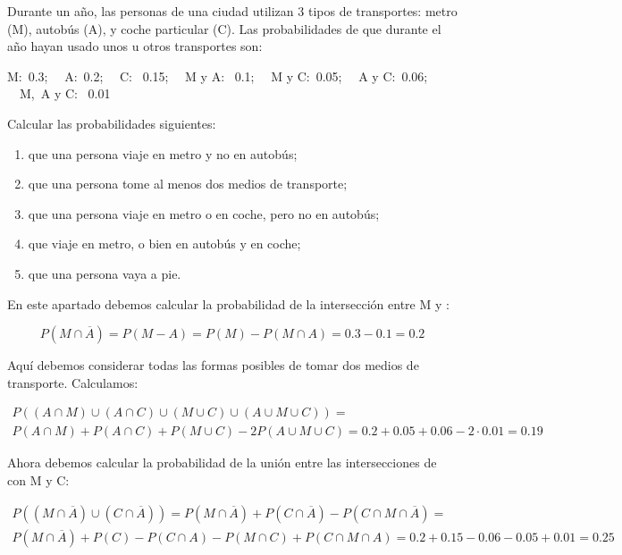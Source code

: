 \problem

Durante un a{\~n}o,  las  personas  de  una  ciudad  utilizan  3  tipos  de
transportes: metro (M),  autob{\'u}s  (A),  y  coche  particular  (C).  Las
probabilidades  de  que  durante  el  a{\~n}o  hayan  usado  unos  u  otros
transportes son:

M:\ 0.3; \ \ A:\ 0.2; \ \ C: \ 0.15; \ \ M y A: \ 0.1; \ \ M y C:\ 0.05; \ \ A y C:\ 0.06; \ \ M,\ A y C: \ 0.01

Calcular las probabilidades siguientes:
\begin{enumerate}
	\item que una persona viaje en metro y no en autob{\'u}s;
	\item que una persona tome al menos dos medios de transporte;
	\item que una persona viaje en metro o en coche, pero no en autob{\'u}s;
	\item que viaje en metro,  o bien en autob{\'u}s y en coche;
	\item que una persona vaya a pie.
\end{enumerate}

\subproblem
En este apartado debemos calcular la probabilidad de la intersección entre M y :

\begin{equation*}
    P(M \cap \overline{A}) = P(M-A) = P(M) - P(M \cap A) = 0.3 - 0.1 = 0.2
\end{equation*}

\subproblem
Aquí debemos considerar todas las formas posibles de tomar dos medios de transporte. Calculamos:

\begin{gather*}
    P((A \cap M) \cup (A \cap C) \cup (M \cup C) \cup (A \cup M \cup C)) =\\ P(A \cap M) + P(A \cap C) + P(M \cup C) - 2P(A \cup M \cup C) = 0.2 + 0.05 + 0.06 - 2 \cdot 0.01 = 0.19
\end{gather*}

\subproblem
Ahora debemos calcular la probabilidad de la unión entre las intersecciones de  con M y C:

\begin{gather*}
    P((M \cap \overline{A}) \cup (C \cap \overline{A})) = P(M \cap \overline{A}) + P(C \cap \overline{A}) - P(C \cap M \cap \overline{A}) = \\P(M \cap \overline{A}) + P(C) - P(C \cap A) - P(M \cap C) + P(C \cap M \cap A) = 0.2 + 0.15 - 0.06 - 0.05 + 0.01 = 0.25
\end{gather*}

